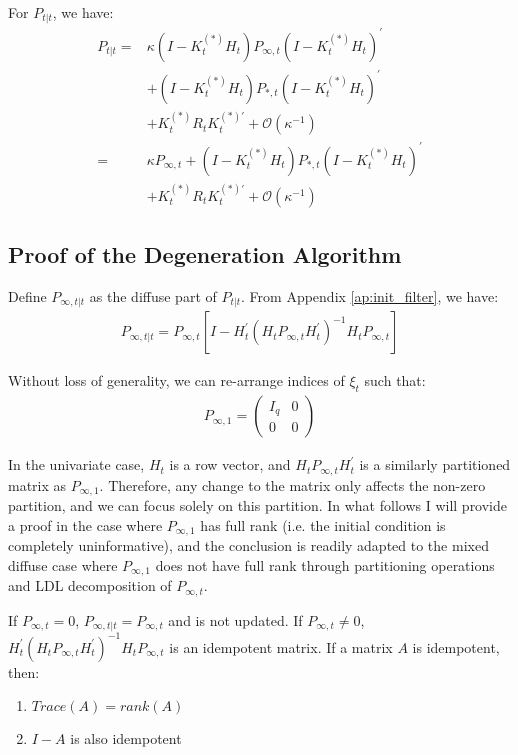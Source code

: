 \documentclass[10pt]{article}
\newenvironment{boenumerate}
    {\begin{enumerate}\renewcommand\labelenumi{\textbf\theenumi}}
    {\end{enumerate}}
\numberwithin{equation}{section}
\begin{document}
For $P_{t|t}$, we have:
\begin{align}
    P_{t|t} =& \kappa (I-K_t^{(*)}H_t)P_{\infty,t}(I-K_t^{(*)}H_t)^{'} \nonumber \\
    &+ (I-K_t^{(*)}H_t)P_{*,t}(I-K_t^{(*)}H_t)^{'} \nonumber \\
    &+ K_t^{(*)}R_tK_t^{(*)'} + \mathcal{O}(\kappa^{-1}) \nonumber \\
    =& \kappa P_{\infty, t} + (I-K_t^{(*)}H_t)P_{*,t}(I-K_t^{(*)}H_t)^{'} \label{eq:diff_P2} \\
    &+ K_t^{(*)}R_tK_t^{(*)'} + \mathcal{O}(\kappa^{-1}) \nonumber
\end{align}

\subsection{Proof of the Degeneration Algorithm} \label{ap:transition}
Define $P_{\infty,t|t}$ as the diffuse part of $P_{t|t}$. From Appendix \ref{ap:init_filter}, we have:
\begin{align*}
    P_{\infty,t|t} = P_{\infty,t}[I - H_t^{'}(H_tP_{\infty,t}H_t^{'})^{-1}H_tP_{\infty,t}]
\end{align*}

Without loss of generality, we can re-arrange indices of $\xi_t$ such that:
\begin{align*}
    P_{\infty,1}=\begin{pmatrix}
        I_q & 0 \\
        0 & 0
    \end{pmatrix}
\end{align*}

In the univariate case, $H_t$ is a row vector, and $H_tP_{\infty,t}H_t^{'}$ is a similarly partitioned matrix as $P_{\infty, 1}$. Therefore, any change to the matrix only affects the non-zero partition, and we can focus solely on this partition. In what follows I will provide a proof in the case where $P_{\infty,1}$ has full rank (i.e. the initial condition is completely uninformative), and the conclusion is readily adapted to the mixed diffuse case where $P_{\infty,1}$ does not have full rank through partitioning operations and LDL decomposition of $P_{\infty,t}$. 

If $P_{\infty,t}=0$, $P_{\infty,t|t} = P_{\infty,t}$ and is not updated. If $P_{\infty,t}\neq0$, $H_t^{'}(H_tP_{\infty,t}H_t^{'})^{-1}H_tP_{\infty,t}$ is an idempotent matrix. If a matrix $A$ is idempotent, then:
\begin{boenumerate}
    \item $Trace(A)=rank(A)$
    \item $I-A$ is also idempotent
\end{boenumerate}
\end{document}
